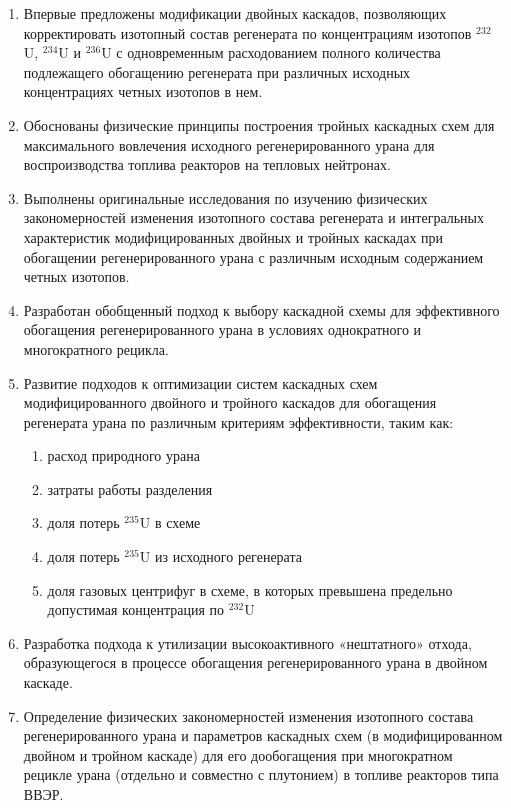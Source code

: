 {\novelty}
\begin{enumerate}
  \item Впервые предложены модификации двойных каскадов, позволяющих корректировать
  изотопный состав регенерата по концентрациям изотопов $^{232}$U, $^{234}$U и $^{236}$U с одновременным расходованием полного количества подлежащего обогащению регенерата при различных исходных концентрациях четных изотопов в нем.
  \item Обоснованы физические принципы построения тройных каскадных схем для максимального вовлечения исходного регенерированного урана для воспроизводства топлива реакторов на тепловых нейтронах.
  \item Выполнены оригинальные исследования по изучению физических закономерностей изменения изотопного состава регенерата и интегральных характеристик модифицированных двойных и тройных каскадах при обогащении регенерированного урана с различным исходным содержанием четных изотопов.
  \item Разработан обобщенный подход к выбору каскадной схемы для эффективного обогащения регенерированного урана в условиях однократного и многократного рецикла.
  \item Развитие подходов к оптимизации систем каскадных схем модифицированного двойного и тройного каскадов для обогащения регенерата урана по различным критериям эффективности, таким как:
  \begin{enumerate}
    \item расход природного урана
    \item затраты работы разделения
    \item доля потерь $^{235}$U в схеме
    \item доля потерь $^{235}$U из исходного регенерата
    \item доля газовых центрифуг в схеме, в которых превышена предельно допустимая концентрация по $^{232}$U
  \end{enumerate}
  \item Разработка подхода к утилизации высокоактивного «нештатного» отхода, образующегося в процессе обогащения регенерированного урана в двойном каскаде.
  \item Определение физических закономерностей изменения изотопного состава регенерированного урана и параметров каскадных схем (в модифицированном двойном и тройном каскаде) для его дообогащения при многократном рецикле урана (отдельно и совместно с плутонием) в топливе реакторов типа ВВЭР.
\end{enumerate}

